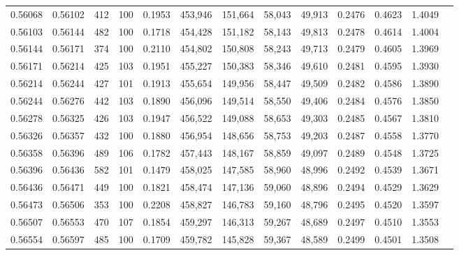 \begin{tabular}{rrrrrrrrrrrrr}
0.56068 & 0.56102 &   412 & 100 &                                     0.1953 & 453,946 & 151,664 &  58,043 &  49,913 & 0.2476 & 0.4623 & 1.4049 \\
0.56103 & 0.56144 &   482 & 100 &                                     0.1718 & 454,428 & 151,182 &  58,143 &  49,813 & 0.2478 & 0.4614 & 1.4004 \\
0.56144 & 0.56171 &   374 & 100 &                                     0.2110 & 454,802 & 150,808 &  58,243 &  49,713 & 0.2479 & 0.4605 & 1.3969 \\
0.56171 & 0.56214 &   425 & 103 &                                     0.1951 & 455,227 & 150,383 &  58,346 &  49,610 & 0.2481 & 0.4595 & 1.3930 \\
0.56214 & 0.56244 &   427 & 101 &                                     0.1913 & 455,654 & 149,956 &  58,447 &  49,509 & 0.2482 & 0.4586 & 1.3890 \\
0.56244 & 0.56276 &   442 & 103 &                                     0.1890 & 456,096 & 149,514 &  58,550 &  49,406 & 0.2484 & 0.4576 & 1.3850 \\
0.56278 & 0.56325 &   426 & 103 &                                     0.1947 & 456,522 & 149,088 &  58,653 &  49,303 & 0.2485 & 0.4567 & 1.3810 \\
0.56326 & 0.56357 &   432 & 100 &                                     0.1880 & 456,954 & 148,656 &  58,753 &  49,203 & 0.2487 & 0.4558 & 1.3770 \\
0.56358 & 0.56396 &   489 & 106 &                                     0.1782 & 457,443 & 148,167 &  58,859 &  49,097 & 0.2489 & 0.4548 & 1.3725 \\
0.56396 & 0.56436 &   582 & 101 &                                     0.1479 & 458,025 & 147,585 &  58,960 &  48,996 & 0.2492 & 0.4539 & 1.3671 \\
0.56436 & 0.56471 &   449 & 100 &                                     0.1821 & 458,474 & 147,136 &  59,060 &  48,896 & 0.2494 & 0.4529 & 1.3629 \\
0.56473 & 0.56506 &   353 & 100 &                                     0.2208 & 458,827 & 146,783 &  59,160 &  48,796 & 0.2495 & 0.4520 & 1.3597 \\
0.56507 & 0.56553 &   470 & 107 &                                     0.1854 & 459,297 & 146,313 &  59,267 &  48,689 & 0.2497 & 0.4510 & 1.3553 \\
0.56554 & 0.56597 &   485 & 100 &                                     0.1709 & 459,782 & 145,828 &  59,367 &  48,589 & 0.2499 & 0.4501 & 1.3508 \\

\end{tabular}
